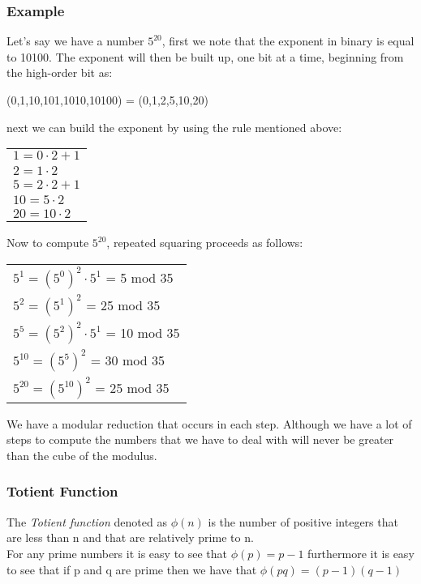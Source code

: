 \documentclass{article}
\begin{document}
\subsubsection{Example}
Let's say we have a number $5^{20}$, first we note that the exponent in binary is equal to 10100. The exponent will then be built up, one bit at a time, beginning from the high-order bit as:
\begin{center}
    (0,1,10,101,1010,10100) = (0,1,2,5,10,20)
\end{center}{}
next we can build the exponent by using the rule mentioned above:
\begin{center}
    \begin{tabular}{l}
    $1 = 0 \cdot 2 + 1$\\
    $2 = 1 \cdot 2$\\
    $5 = 2 \cdot 2 + 1$\\
    $10 = 5 \cdot 2$\\
    $20 = 10 \cdot 2$\\
    \end{tabular}{}
\end{center}{}
Now to compute $5^{20}$, repeated squaring proceeds as follows:
\begin{center}
\begin{tabular}{l}
    $5^1 = (5^0)^2 \cdot 5^1$ = 5 mod 35\\
    $5^2 = (5^1)^2$ = 25 mod 35\\
    $5^5 = (5^2)^2 \cdot 5^1$ = 10 mod 35\\
    $5^{10} = (5^5)^2$ = 30 mod 35\\
    $5^{20} = (5^{10})^2$ = 25 mod 35\\
    \end{tabular}{}
\end{center}{}
We have a modular reduction that occurs in each step. Although we have a lot of steps to compute the numbers that we have to deal with will never be greater than the cube of the modulus.

\subsubsection{Totient Function}
The \textit{Totient function} denoted as $\phi(n)$ is the number of positive integers that are less than n and that are relatively prime to n.\\
For any prime numbers it is easy to see that $\phi(p) = p-1$ furthermore it is easy to see that if p and q are prime then we have that $\phi(pq) = (p-1)(q-1)$
\end{document}
